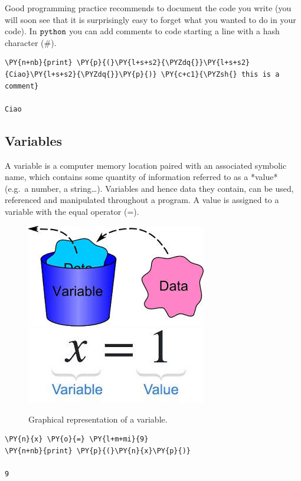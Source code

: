 Good programming practice recommends to document the code you write (you will soon see that it is surprisingly easy to forget what you wanted to do in your code). In \(\tt{python}\) you can add comments to code starting a line with a hash character (\#).

\begin{tcolorbox}[breakable, size=fbox, boxrule=1pt, pad at break*=1mm, colback=cellbackground, colframe=cellborder]
\begin{Verbatim}[commandchars=\\\{\}]
\PY{n+nb}{print} \PY{p}{(}\PY{l+s+s2}{\PYZdq{}}\PY{l+s+s2}{Ciao}\PY{l+s+s2}{\PYZdq{}}\PY{p}{)} \PY{c+c1}{\PYZsh{} this is a comment}

Ciao
\end{Verbatim}
\end{tcolorbox}

\subsection{Variables}\label{variables}

A variable is a computer memory location paired with an associated symbolic name, which contains some quantity of information referred to as a *value* (e.g.~a number, a string\ldots{}). Variables and hence data they contain, can be used, referenced and manipulated throughout a program.
A value is assigned to a variable with the equal operator (=). 

\begin{figure}[h]
\centering
\includegraphics[width=0.5\linewidth]{var1.jpeg}
\includegraphics[width=0.5\linewidth]{var2.jpeg}
\caption{Graphical representation of a variable.}
\end{figure}

\begin{tcolorbox}[breakable, size=fbox, boxrule=1pt, pad at break*=1mm, colback=cellbackground, colframe=cellborder]
\begin{Verbatim}[commandchars=\\\{\}]
\PY{n}{x} \PY{o}{=} \PY{l+m+mi}{9}
\PY{n+nb}{print} \PY{p}{(}\PY{n}{x}\PY{p}{)}

9
\end{Verbatim}
\end{tcolorbox}

